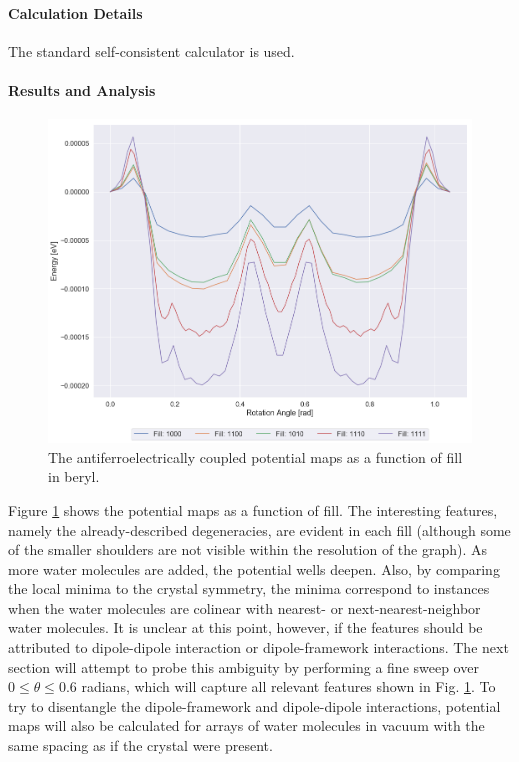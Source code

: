         \paragraph{Calculation Details} The standard self-consistent calculator is used.
        
        \paragraph{Results and Analysis}
        
        \begin{figure}
            \centering
            \includegraphics[width=0.9\linewidth]{Figures/System/pmap_af_broad.png}
            \caption{The antiferroelectrically coupled potential maps as a function of fill in beryl.}
            \label{fig:pmap_af_broad}
        \end{figure}
        
        Figure \ref{fig:pmap_af_broad} shows the potential maps as a function of fill. The interesting features, namely the already-described degeneracies, are evident in each fill (although some of the smaller shoulders are not visible within the resolution of the graph). As more water molecules are added, the potential wells deepen. Also, by comparing the local minima to the crystal symmetry, the minima correspond to instances when the water molecules are colinear with nearest- or next-nearest-neighbor water molecules. It is unclear at this point, however, if the features should be attributed to dipole-dipole interaction or dipole-framework interactions. The next section will attempt to probe this ambiguity by performing a fine sweep over $0\le \theta \le 0.6$ radians, which will capture all relevant features shown in Fig. \ref{fig:pmap_af_broad}. To try to disentangle the dipole-framework and dipole-dipole interactions, potential maps will also be calculated for arrays of water molecules in vacuum with the same spacing as if the crystal were present.
        
